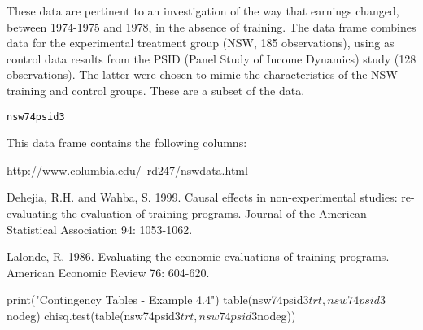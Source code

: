 \begin{Description}\relax
These data are pertinent to an investigation of the way that   
earnings changed, between 1974-1975 and 1978, in the absence
of training.  The data frame combines data for the experimental treatment 
group (NSW, 185 observations), using as control data results from the PSID 
(Panel Study of Income Dynamics) study (128 observations).  The latter
were chosen to mimic the characteristics of the NSW training
and control groups.  These are a subset of the  data.
\end{Description}
\begin{Usage}
\begin{verbatim}nsw74psid3\end{verbatim}
\end{Usage}
\begin{Format}\relax
This data frame contains the following columns:
\end{Format}
\begin{Source}\relax
http://www.columbia.edu/~rd247/nswdata.html
\end{Source}
\begin{References}\relax
Dehejia, R.H. and Wahba, S. 1999. Causal effects in
non-experimental studies: re-evaluating the evaluation of training
programs. Journal of the American Statistical Association 94:
1053-1062.

Lalonde, R. 1986. Evaluating the economic evaluations of
training programs. American Economic Review 76: 604-620.
\end{References}
\begin{Examples}
\begin{ExampleCode}
print("Contingency Tables - Example 4.4")
table(nsw74psid3$trt, nsw74psid3$nodeg)
chisq.test(table(nsw74psid3$trt,nsw74psid3$nodeg))
\end{ExampleCode}
\end{Examples}

